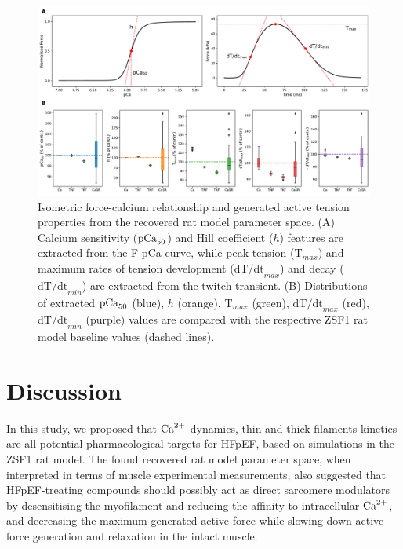 \begin{figure}[ht!]
    \myfloatalign
    \includegraphics[width=\textwidth]{figures/chapter07/FpCa_T_trends_explained.pdf}
    \caption{Isometric force-calcium relationship and generated active tension properties from the recovered rat model parameter space. (A) Calcium sensitivity ($\textrm{pCa}_{50}$) and Hill coefficient ($h$) features are extracted from the F-pCa curve, while peak tension ($\textrm{T}_{max}$) and maximum rates of tension development ($\textrm{dT/dt}_{max}$) and decay ($\textrm{dT/dt}_{min}$) are extracted from the twitch transient. (B) Distributions of extracted $\textrm{pCa}_{50}$ (blue), $h$ (orange), $\textrm{T}_{max}$ (green), $\textrm{dT/dt}_{max}$ (red), $\textrm{dT/dt}_{min}$ (purple) values are compared with the respective ZSF1 rat model baseline values (dashed lines).}
    \label{fig:fpcatension}
\end{figure}


%
%
%
\section{Discussion}\label{sec:ch7discussion}
In this study, we proposed that $\textrm{Ca}^{2+}$ dynamics, thin and thick filaments kinetics are all potential pharmacological targets for HFpEF, based on simulations in the ZSF1 rat model. The found recovered rat model parameter space, when interpreted in terms of muscle experimental measurements, also suggested that HFpEF-treating compounds should possibly act as direct sarcomere modulators by desensitising the myofilament and reducing the affinity to intracellular $\textrm{Ca}^{2+}$, and decreasing the maximum generated active force while slowing down active force generation and relaxation in the intact muscle.

